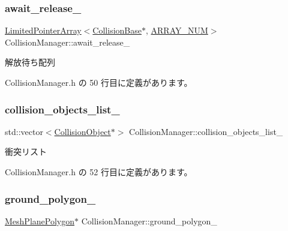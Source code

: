 \subsubsection{\texorpdfstring{await\+\_\+release\+\_\+}{await\_release\_}}
{\footnotesize\ttfamily \mbox{\hyperlink{class_limited_pointer_array}{Limited\+Pointer\+Array}}$<$\mbox{\hyperlink{class_collision_base}{Collision\+Base}}$\ast$, \mbox{\hyperlink{class_collision_manager_addbc64e1fa0b01f3be07c897887f44ec}{A\+R\+R\+A\+Y\+\_\+\+N\+UM}}$>$ Collision\+Manager\+::await\+\_\+release\+\_\+\hspace{0.3cm}{\ttfamily [private]}}



解放待ち配列 



 Collision\+Manager.\+h の 50 行目に定義があります。

\mbox{\label{class_collision_manager_a11b347344cfec378a0e752b4720e16b1}} 
\subsubsection{\texorpdfstring{collision\+\_\+objects\+\_\+list\+\_\+}{collision\_objects\_list\_}}
{\footnotesize\ttfamily std\+::vector$<$\mbox{\hyperlink{class_collision_object}{Collision\+Object}}$\ast$$>$ Collision\+Manager\+::collision\+\_\+objects\+\_\+list\+\_\+\hspace{0.3cm}{\ttfamily [private]}}



衝突リスト 



 Collision\+Manager.\+h の 52 行目に定義があります。

\mbox{\label{class_collision_manager_ab080264a45322bec38189279428d44cb}} 
\subsubsection{\texorpdfstring{ground\+\_\+polygon\+\_\+}{ground\_polygon\_}}
{\footnotesize\ttfamily \mbox{\hyperlink{class_mesh_plane_polygon}{Mesh\+Plane\+Polygon}}$\ast$ Collision\+Manager\+::ground\+\_\+polygon\+\_\+\hspace{0.3cm}{\ttfamily [private]}}



